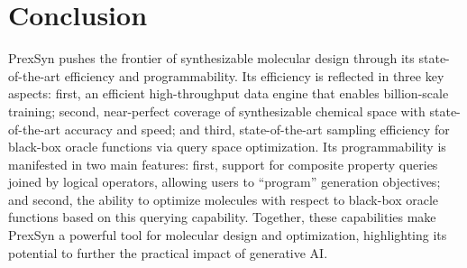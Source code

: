 \section{Conclusion}
\label{sec:concl}

PrexSyn pushes the frontier of synthesizable molecular design through its state-of-the-art efficiency and programmability.
Its efficiency is reflected in three key aspects:
first, an efficient high-throughput data engine that enables billion-scale training; second, near-perfect coverage of synthesizable chemical space with state-of-the-art accuracy and speed; and third, state-of-the-art sampling efficiency for black-box oracle functions via query space optimization.
Its programmability is manifested in two main features:
first, support for composite property queries joined by logical operators, allowing users to ``program'' generation objectives; and second, the ability to optimize molecules with respect to black-box oracle functions based on this querying capability.
Together, these capabilities make PrexSyn a powerful tool for molecular design and optimization, highlighting its potential to further the practical impact of generative AI.
